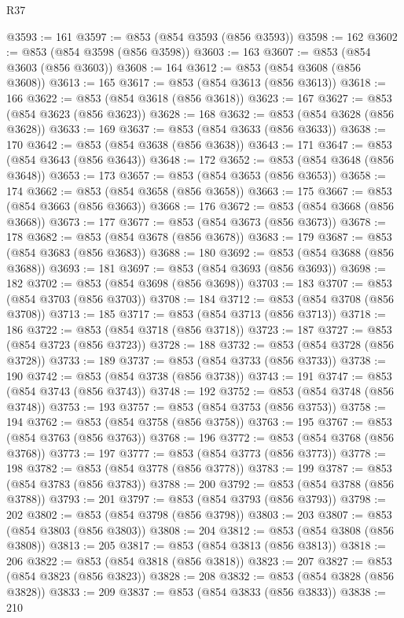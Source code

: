\begin{lexlean}{R37}
\begin{coremodule}
@3593 := 161
@3597 := @853 (@854 @3593 (@856 @3593))
@3598 := 162
@3602 := @853 (@854 @3598 (@856 @3598))
@3603 := 163
@3607 := @853 (@854 @3603 (@856 @3603))
@3608 := 164
@3612 := @853 (@854 @3608 (@856 @3608))
@3613 := 165
@3617 := @853 (@854 @3613 (@856 @3613))
@3618 := 166
@3622 := @853 (@854 @3618 (@856 @3618))
@3623 := 167
@3627 := @853 (@854 @3623 (@856 @3623))
@3628 := 168
@3632 := @853 (@854 @3628 (@856 @3628))
@3633 := 169
@3637 := @853 (@854 @3633 (@856 @3633))
@3638 := 170
@3642 := @853 (@854 @3638 (@856 @3638))
@3643 := 171
@3647 := @853 (@854 @3643 (@856 @3643))
@3648 := 172
@3652 := @853 (@854 @3648 (@856 @3648))
@3653 := 173
@3657 := @853 (@854 @3653 (@856 @3653))
@3658 := 174
@3662 := @853 (@854 @3658 (@856 @3658))
@3663 := 175
@3667 := @853 (@854 @3663 (@856 @3663))
@3668 := 176
@3672 := @853 (@854 @3668 (@856 @3668))
@3673 := 177
@3677 := @853 (@854 @3673 (@856 @3673))
@3678 := 178
@3682 := @853 (@854 @3678 (@856 @3678))
@3683 := 179
@3687 := @853 (@854 @3683 (@856 @3683))
@3688 := 180
@3692 := @853 (@854 @3688 (@856 @3688))
@3693 := 181
@3697 := @853 (@854 @3693 (@856 @3693))
@3698 := 182
@3702 := @853 (@854 @3698 (@856 @3698))
@3703 := 183
@3707 := @853 (@854 @3703 (@856 @3703))
@3708 := 184
@3712 := @853 (@854 @3708 (@856 @3708))
@3713 := 185
@3717 := @853 (@854 @3713 (@856 @3713))
@3718 := 186
@3722 := @853 (@854 @3718 (@856 @3718))
@3723 := 187
@3727 := @853 (@854 @3723 (@856 @3723))
@3728 := 188
@3732 := @853 (@854 @3728 (@856 @3728))
@3733 := 189
@3737 := @853 (@854 @3733 (@856 @3733))
@3738 := 190
@3742 := @853 (@854 @3738 (@856 @3738))
@3743 := 191
@3747 := @853 (@854 @3743 (@856 @3743))
@3748 := 192
@3752 := @853 (@854 @3748 (@856 @3748))
@3753 := 193
@3757 := @853 (@854 @3753 (@856 @3753))
@3758 := 194
@3762 := @853 (@854 @3758 (@856 @3758))
@3763 := 195
@3767 := @853 (@854 @3763 (@856 @3763))
@3768 := 196
@3772 := @853 (@854 @3768 (@856 @3768))
@3773 := 197
@3777 := @853 (@854 @3773 (@856 @3773))
@3778 := 198
@3782 := @853 (@854 @3778 (@856 @3778))
@3783 := 199
@3787 := @853 (@854 @3783 (@856 @3783))
@3788 := 200
@3792 := @853 (@854 @3788 (@856 @3788))
@3793 := 201
@3797 := @853 (@854 @3793 (@856 @3793))
@3798 := 202
@3802 := @853 (@854 @3798 (@856 @3798))
@3803 := 203
@3807 := @853 (@854 @3803 (@856 @3803))
@3808 := 204
@3812 := @853 (@854 @3808 (@856 @3808))
@3813 := 205
@3817 := @853 (@854 @3813 (@856 @3813))
@3818 := 206
@3822 := @853 (@854 @3818 (@856 @3818))
@3823 := 207
@3827 := @853 (@854 @3823 (@856 @3823))
@3828 := 208
@3832 := @853 (@854 @3828 (@856 @3828))
@3833 := 209
@3837 := @853 (@854 @3833 (@856 @3833))
@3838 := 210

\end{coremodule}
\end{lexlean}
